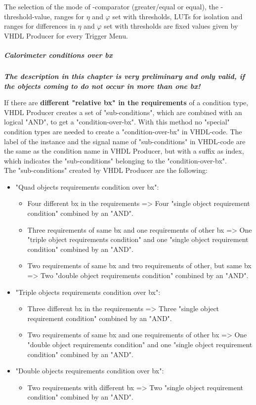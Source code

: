 The selection of the mode of \et-comparator (greater/equal or equal), the \et-threshold-value, ranges for $\eta$ and $\varphi$ set with thresholds, LUTs for isolation and
ranges for differences in $\eta$ and $\varphi$ set with thresholds are fixed values given by VHDL Producer for every Trigger Menu.

\subparagraph{Calorimeter conditions over bx}\label{sec:gtl:calo_cond_over_bx}

\textbf{\textit{The description in this chapter is very preliminary and only valid, if the objects coming to \ugt do not occur in more than one bx!}}

If there are \textbf{different "relative bx" in the requirements} of a condition type, VHDL Producer creates a set of "sub-conditions", which are combined with an logical "AND", to get a "condition-over-bx".
With this method no "special" condition types are needed to create a "condition-over-bx" in VHDL-code. The label of the instance and the signal name of "sub-conditions" in VHDL-code are the
same as the condition name in VHDL Producer, but with a suffix as index, which indicates the "sub-conditions" belonging to the "condition-over-bx".\\
The "sub-conditions" created by VHDL Producer are the following:
\begin{itemize}
\item "Quad objects requirements condition over bx":
    \begin{itemize}
    \item Four different bx in the requirements => Four "single object requirement condition" combined by an "AND".
    \item Three requirements of same bx and one requirements of other bx => One "triple object requirements condition" and one "single object requirement condition" combined by an "AND".
    \item Two requirements of same bx and two requirements of other, but same bx => Two "double object requirements condition" combined by an "AND".
    \end{itemize}
\item "Triple objects requirements condition over bx":
    \begin{itemize}
    \item Three different bx in the requirements => Three "single object requirement condition" combined by an "AND".
    \item Two requirements of same bx and one requirements of other bx => One "double object requirements condition" and one "single object requirement condition" combined by an "AND".
    \end{itemize}
\item "Double objects requirements condition over bx":
    \begin{itemize}
    \item Two requirements with different bx => Two "single object requirement condition" combined by an "AND".
    \end{itemize}
\end{itemize}

